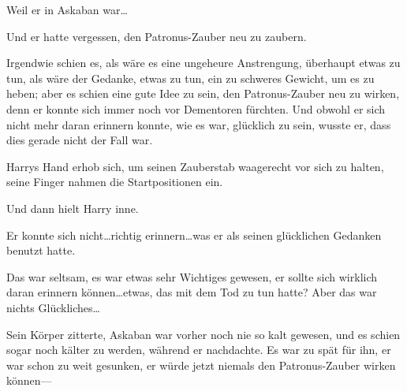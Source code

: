 Weil er in Askaban war…

Und er hatte vergessen, den Patronus-Zauber neu zu zaubern.

Irgendwie schien es, als wäre es eine ungeheure Anstrengung, überhaupt etwas zu tun, als wäre der Gedanke, etwas zu tun, ein zu schweres Gewicht, um es zu heben; aber es schien eine gute Idee zu sein, den Patronus-Zauber neu zu wirken, denn er konnte sich immer noch vor Dementoren fürchten. Und obwohl er sich nicht mehr daran erinnern konnte, wie es war, glücklich zu sein, wusste er, dass dies gerade nicht der Fall war.

Harrys Hand erhob sich, um seinen Zauberstab waagerecht vor sich zu halten, seine Finger nahmen die Startpositionen ein.

Und dann hielt Harry inne.

Er konnte sich nicht…richtig erinnern…was er als seinen glücklichen Gedanken benutzt hatte.

Das war seltsam, es war etwas sehr Wichtiges gewesen, er sollte sich wirklich daran erinnern können…etwas, das mit dem Tod zu tun hatte? Aber das war nichts Glückliches…

Sein Körper zitterte, Askaban war vorher noch nie so kalt gewesen, und es schien sogar noch kälter zu werden, während er nachdachte. Es war zu spät für ihn, er war schon zu weit gesunken, er würde jetzt niemals den Patronus-Zauber wirken können—

